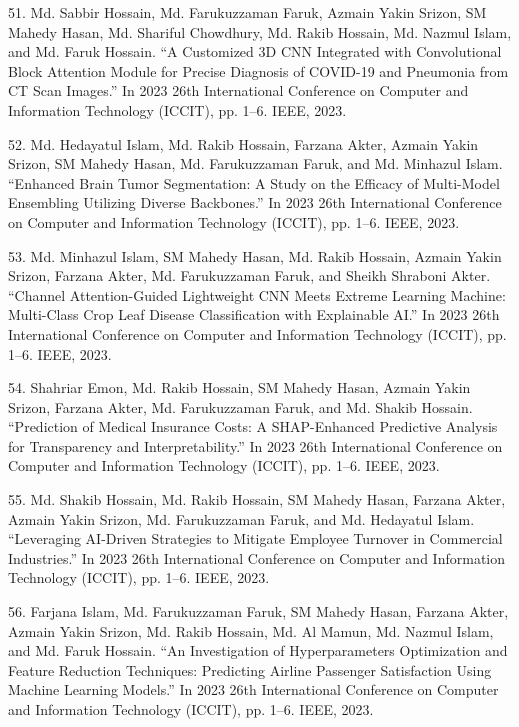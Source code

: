 \documentclass[a4paper,10pt]{article}
\newlength{\cvcolumngapwidth}
\newlength{\cvleftcolumnwidth}
\newlength{\cvrightcolumnwidth}
\newcommand{\cvdurationstyle}[1]{{\small\cvdurationfont\textcolor{cvdurationcolor}{#1}}}
\newlength{\cvafteritemskipamount}
\newlength{\cvparskip}
\newcommand{\cvitem}[2]{
    \begin{minipage}[t]{\cvleftcolumnwidth}
        \raggedleft #1
    \end{minipage}%
    \hspace{\cvcolumngapwidth}%
    \begin{minipage}[t]{\cvrightcolumnwidth}
        \setlength{\parskip}{\cvparskip} #2
    \end{minipage}

    \vspace{\cvafteritemskipamount}
}
\begin{document}
\cvitem{
    \cvdurationstyle{}
}{
51. Md. Sabbir Hossain, Md. Farukuzzaman Faruk, Azmain Yakin Srizon, SM Mahedy Hasan, Md. Shariful Chowdhury, Md. Rakib Hossain, Md. Nazmul Islam, and Md. Faruk Hossain. “A Customized 3D CNN Integrated with Convolutional Block Attention Module for Precise Diagnosis of COVID-19 and Pneumonia from CT Scan Images.” In 2023 26th International Conference on Computer and Information Technology (ICCIT), pp. 1–6. IEEE, 2023.
}

\cvitem{
    \cvdurationstyle{}
}{
52. Md. Hedayatul Islam, Md. Rakib Hossain, Farzana Akter, Azmain Yakin Srizon, SM Mahedy Hasan, Md. Farukuzzaman Faruk, and Md. Minhazul Islam. “Enhanced Brain Tumor Segmentation: A Study on the Efficacy of Multi-Model Ensembling Utilizing Diverse Backbones.” In 2023 26th International Conference on Computer and Information Technology (ICCIT), pp. 1–6. IEEE, 2023.
}

\cvitem{
    \cvdurationstyle{}
}{
53. Md. Minhazul Islam, SM Mahedy Hasan, Md. Rakib Hossain, Azmain Yakin Srizon, Farzana Akter, Md. Farukuzzaman Faruk, and Sheikh Shraboni Akter. “Channel Attention-Guided Lightweight CNN Meets Extreme Learning Machine: Multi-Class Crop Leaf Disease Classification with Explainable AI.” In 2023 26th International Conference on Computer and Information Technology (ICCIT), pp. 1–6. IEEE, 2023.
}

\cvitem{
    \cvdurationstyle{}
}{
54. Shahriar Emon, Md. Rakib Hossain, SM Mahedy Hasan, Azmain Yakin Srizon, Farzana Akter, Md. Farukuzzaman Faruk, and Md. Shakib Hossain. “Prediction of Medical Insurance Costs: A SHAP-Enhanced Predictive Analysis for Transparency and Interpretability.” In 2023 26th International Conference on Computer and Information Technology (ICCIT), pp. 1–6. IEEE, 2023.
}

\cvitem{
    \cvdurationstyle{}
}{
55. Md. Shakib Hossain, Md. Rakib Hossain, SM Mahedy Hasan, Farzana Akter, Azmain Yakin Srizon, Md. Farukuzzaman Faruk, and Md. Hedayatul Islam. “Leveraging AI-Driven Strategies to Mitigate Employee Turnover in Commercial Industries.” In 2023 26th International Conference on Computer and Information Technology (ICCIT), pp. 1–6. IEEE, 2023.
}

\cvitem{
    \cvdurationstyle{}
}{
56. Farjana Islam, Md. Farukuzzaman Faruk, SM Mahedy Hasan, Farzana Akter, Azmain Yakin Srizon, Md. Rakib Hossain, Md. Al Mamun, Md. Nazmul Islam, and Md. Faruk Hossain. “An Investigation of Hyperparameters Optimization and Feature Reduction Techniques: Predicting Airline Passenger Satisfaction Using Machine Learning Models.” In 2023 26th International Conference on Computer and Information Technology (ICCIT), pp. 1–6. IEEE, 2023.
}
\end{document}
